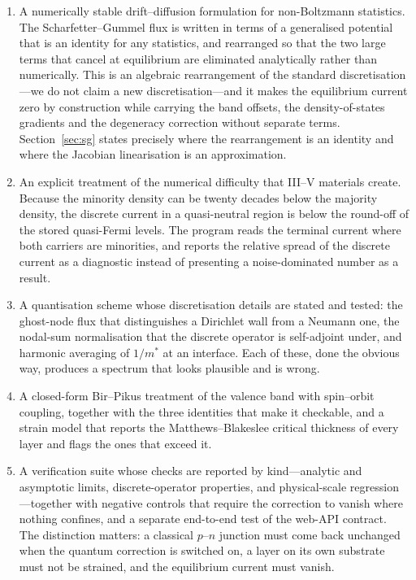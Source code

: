 \documentclass[preprint,12pt]{elsarticle}
\begin{document}
\begin{enumerate}
\item A numerically stable drift--diffusion formulation for non-Boltzmann
      statistics. The Scharfetter--Gummel flux is written in terms of a
      generalised potential that is an identity for any statistics, and
      rearranged so that the two large terms that cancel at equilibrium are
      eliminated analytically rather than numerically. This is an algebraic
      rearrangement of the standard discretisation---we do not claim a new
      discretisation---and it makes the equilibrium current zero by
      construction while carrying the band offsets, the density-of-states
      gradients and the degeneracy correction without separate terms.
      Section~\ref{sec:sg} states precisely where the rearrangement is an
      identity and where the Jacobian linearisation is an approximation.
\item An explicit treatment of the numerical difficulty that III--V materials
      create. Because the minority density can be twenty decades below the
      majority density, the discrete current in a quasi-neutral region is
      below the round-off of the stored quasi-Fermi levels. The program reads
      the terminal current where both carriers are minorities, and reports the
      relative spread of the discrete current as a diagnostic instead of
      presenting a noise-dominated number as a result.
\item A quantisation scheme whose discretisation details are stated and
      tested: the ghost-node flux that distinguishes a Dirichlet wall from a
      Neumann one, the nodal-sum normalisation that the discrete operator is
      self-adjoint under, and harmonic averaging of $1/m^{*}$ at an interface.
      Each of these, done the obvious way, produces a spectrum that looks
      plausible and is wrong.
\item A closed-form Bir--Pikus treatment of the valence band with spin--orbit
      coupling, together with the three identities that make it checkable, and
      a strain model that reports the Matthews--Blakeslee critical thickness of every layer and flags the ones that exceed it.
\item A verification suite whose checks are reported by kind---analytic and
      asymptotic limits, discrete-operator properties, and physical-scale
      regression---together with negative controls that require the
      correction to vanish where nothing confines, and a separate end-to-end
      test of the web-API contract. The distinction matters: a classical
      $p$--$n$ junction must come back unchanged when the quantum correction
      is switched on, a layer on its own substrate must not be strained, and
      the equilibrium current must vanish.
\end{enumerate}
\end{document}
